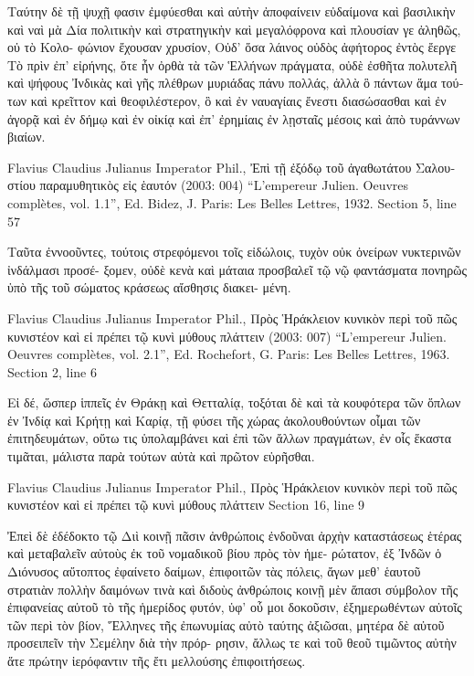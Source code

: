 \documentclass[12pt,letterpaper,twoside,final]{memoir}
\begin{document}
\begin{greek}
                                                Ταύτην δὲ τῇ 
ψυχῇ φασιν ἐμφύεσθαι καὶ αὐτὴν ἀποφαίνειν εὐδαίμονα 
καὶ βασιλικὴν καὶ ναὶ μὰ Δία πολιτικὴν καὶ στρατηγικὴν 
καὶ μεγαλόφρονα καὶ πλουσίαν γε ἀληθῶς, οὐ τὸ Κολο-
φώνιον ἔχουσαν χρυσίον, 
  Οὐδ' ὅσα λάινος οὐδὸς ἀφήτορος ἐντὸς ἔεργε 
  Τὸ πρὶν ἐπ' εἰρήνης, 
ὅτε ἦν ὀρθὰ τὰ τῶν Ἑλλήνων πράγματα, οὐδὲ ἐσθῆτα 
πολυτελῆ καὶ ψήφους Ἰνδικὰς καὶ γῆς πλέθρων μυριάδας 
πάνυ πολλάς, ἀλλὰ ὃ πάντων ἅμα τούτων καὶ κρεῖττον καὶ 
θεοφιλέστερον, ὃ καὶ ἐν ναυαγίαις ἔνεστι διασώσασθαι καὶ 
ἐν ἀγορᾷ καὶ ἐν δήμῳ καὶ ἐν οἰκίᾳ καὶ ἐπ' ἐρημίαις ἐν 
λῃσταῖς μέσοις καὶ ἀπὸ τυράννων βιαίων. 



Flavius Claudius Julianus Imperator Phil., Ἐπὶ τῇ ἐξόδῳ τοῦ ἀγαθωτάτου Σαλουστίου παραμυθητικὸς εἰς ἑαυτόν (2003: 004)
“L'empereur Julien. Oeuvres complètes, vol. 1.1”, Ed. Bidez, J.
Paris: Les Belles Lettres, 1932.
Section 5, line 57

             Ταῦτα ἐννοοῦντες, τούτοις στρεφόμενοι τοῖς 
εἰδώλοις, τυχὸν οὐκ ὀνείρων νυκτερινῶν ἰνδάλμασι προσέ-
ξομεν, οὐδὲ κενὰ καὶ μάταια προσβαλεῖ τῷ νῷ φαντάσματα 
πονηρῶς ὑπὸ τῆς τοῦ σώματος κράσεως αἴσθησις διακει-
μένη. 



Flavius Claudius Julianus Imperator Phil., Πρὸς Ἡράκλειον κυνικὸν περὶ τοῦ πῶς κυνιστέον καὶ εἰ πρέπει τῷ κυνὶ μύθους πλάττειν (2003: 007)
“L'empereur Julien. Oeuvres complètes, vol. 2.1”, Ed. Rochefort, G.
Paris: Les Belles Lettres, 1963.
Section 2, line 6

             Εἰ δέ, ὥσπερ ἱππεῖς ἐν Θράκῃ καὶ Θετταλίᾳ, 
τοξόται δὲ καὶ τὰ κουφότερα τῶν ὅπλων ἐν Ἰνδίᾳ καὶ 
Κρήτῃ καὶ Καρίᾳ, τῇ φύσει τῆς χώρας ἀκολουθούντων 
οἶμαι τῶν ἐπιτηδευμάτων, οὕτω τις ὑπολαμβάνει καὶ ἐπὶ 
τῶν ἄλλων πραγμάτων, ἐν οἷς ἕκαστα τιμᾶται, μάλιστα 
παρὰ τούτων αὐτὰ καὶ πρῶτον εὑρῆσθαι. 



Flavius Claudius Julianus Imperator Phil., Πρὸς Ἡράκλειον κυνικὸν περὶ τοῦ πῶς κυνιστέον καὶ εἰ πρέπει τῷ κυνὶ μύθους πλάττειν 
Section 16, line 9

                             Ἐπεὶ δὲ ἐδέδοκτο τῷ Διὶ κοινῇ 
πᾶσιν ἀνθρώποις ἐνδοῦναι ἀρχὴν καταστάσεως ἑτέρας καὶ 
μεταβαλεῖν αὐτοὺς ἐκ τοῦ νομαδικοῦ βίου πρὸς τὸν ἡμε-
ρώτατον, ἐξ Ἰνδῶν ὁ Διόνυσος αὔτοπτος ἐφαίνετο δαίμων, 
ἐπιφοιτῶν τὰς πόλεις, ἄγων μεθ' ἑαυτοῦ στρατιὰν πολλὴν 
δαιμόνων τινὰ καὶ διδοὺς ἀνθρώποις κοινῇ μὲν ἅπασι 
σύμβολον τῆς ἐπιφανείας αὐτοῦ τὸ τῆς ἡμερίδος φυτόν, 
ὑφ' οὗ μοι δοκοῦσιν, ἐξημερωθέντων αὐτοῖς τῶν περὶ τὸν 
βίον, Ἕλληνες τῆς ἐπωνυμίας αὐτὸ ταύτης ἀξιῶσαι, 
μητέρα δὲ αὐτοῦ προσειπεῖν τὴν Σεμέλην διὰ τὴν πρόρ-
ρησιν, ἄλλως τε καὶ τοῦ θεοῦ τιμῶντος αὐτὴν ἅτε πρώτην 
ἱερόφαντιν τῆς ἔτι μελλούσης ἐπιφοιτήσεως. 




\end{greek}
\end{document}
